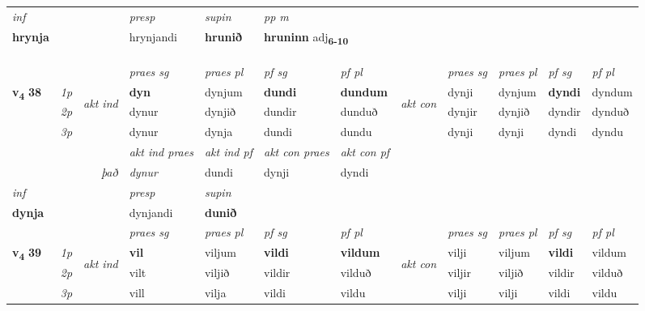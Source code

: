 \begin{longtable}[l]{X>{\footnotesize\itshape}llXXXXlXXXX}
   {\textit{inf}} & &     & \textit{presp} & \textit{supin}  & \textit{pp m} \\*
  {\textbf{hrynja}} & &     & hrynjandi &  \textbf{hrunið}  & \multicolumn{2}{l}{\textbf{hruninn} adj\textbf{\textsubscript{6-10}}} \\*

\midrule
  & \\*
   & \\*
  & \\
   \midrule

 & &   & \textit{praes sg}  & \textit{praes pl}    & \textit{ pf sg} & \textit{pf pl} & & \textit{praes sg}  & \textit{praes pl}    & \textit{pf sg} & \textit{pf pl }  \\ \cmidrule{4-7} \cmidrule{9-12}
 \multirow{2}{*}{{{\textbf{v{\textsubscript{4}}} \Large{\textbf{38}}}}}  & 1p & \multirow{3}{*}{\begin{turn}{90}\textit{akt ind}\end{turn}} & \textbf{dyn} & dynjum & \textbf{dundi} & \textbf{dundum} & \multirow{3}{*}{\begin{turn}{90}\textit{akt con}\end{turn}} &dynji & dynjum & \textbf{dyndi} & dyndum\\*
 & 2p &  &  dynur  & dynjið & dundir & dunduð & & dynjir & dynjið & dyndir & dynduð \\*
 & 3p &  & dynur & dynja & dundi & dundu & & dynji & dynji& dyndi & dyndu \\*
\cmidrule{4-7} \cmidrule{9-12}

   && &  \textit{akt ind praes} & \textit{akt ind pf} & \textit{akt con praes} & \textit{akt con pf} \\*
\multicolumn{3}{r}{\textit{það}} & dynur & dundi & dynji & dyndi \\*

\cmidrule{4-7}
   {\textit{inf}} & &     & \textit{presp} & \textit{supin}   \\*
  {\textbf{dynja}} & &     & dynjandi &  \textbf{dunið}   \\*

\midrule

 & &   & \textit{praes sg}  & \textit{praes pl}    & \textit{ pf sg} & \textit{pf pl} & & \textit{praes sg}  & \textit{praes pl}    & \textit{pf sg} & \textit{pf pl }  \\ \cmidrule{4-7} \cmidrule{9-12}
 \multirow{2}{*}{{{\textbf{v{\textsubscript{4}}} \Large{\textbf{39}}}}}  & 1p & \multirow{3}{*}{\begin{turn}{90}\textit{akt ind}\end{turn}} & \textbf{vil} & viljum & \textbf{vildi} & \textbf{vildum} & \multirow{3}{*}{\begin{turn}{90}\textit{akt con}\end{turn}} &vilji & viljum & \textbf{vildi} & vildum\\*
 & 2p &  &  vilt  & viljið & vildir & vilduð & & viljir & viljið & vildir & vilduð \\*
 & 3p &  & vill & vilja & vildi & vildu & & vilji & vilji& vildi & vildu \\*
\cmidrule{4-7} \cmidrule{9-12}


\end{longtable}
